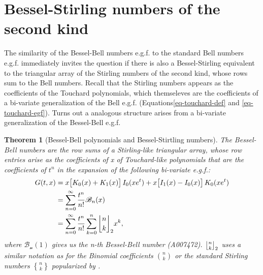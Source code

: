 \documentclass[a4paper]{amsart}
\newcommand{\Stirling}[0]{\genfrac\{\}{0pt}{}}
\newcommand{\mStirling}[0]{\genfrac{\lfloor}{\rfloor}{0pt}{}}
\newtheorem{theorem}{Theorem}
\begin{document}
\section{Bessel-Stirling numbers of the second kind}\label{sec-2-stirling}

The similarity of the Bessel-Bell numbers e.g.f. to the standard Bell numbers e.g.f. immediately invites the question if there is also a Bessel-Stirling equivalent to the triangular array of the Stirling numbers of the second kind, whose rows sum to the Bell numbers. Recall that the Stirling numbers appears as the coefficients of the Touchard polynomials, which themseleves are the coefficients of a bi-variate generalization of the Bell e.g.f. (Equations\eqref{eq-touchard-def} and \eqref{eq-touchard-egf}). Turns out a analogous structure arises from a bi-variate generalization of the Bessel-Bell e.g.f.

\begin{theorem}[Bessel-Bell polynomials and Bessel-Stirtling numbers]\label{thm-bb-polynomials}
The Bessel-Bell numbers are the row sums of a Stirling-like triangular array, whose row entries arise as the coefficients of x of Touchard-like polynomials that are the coefficients of $t^n$ in the expansion of the following bi-variate e.g.f.:
    \begin{equation*}
        \begin{aligned}
        G(t,x) &= x\big[K_0(x)+K_1(x)\big]\, I_0(x e^t) + x\big[I_1(x)-I_0(x)\big]\,K_0(xe^t)\\
                       &= \sum_{n=0}^\infty \frac{t^n}{n!}\mathscr{B}_n(x) \\
                       & = \sum_{n=0}^\infty\frac{t^n}{n!}\sum_{k=0}^{n}\mStirling{n}{k}_2 x^k, \\
        \end{aligned}
    \end{equation*}
    where $\mathscr{B_n}(1)$ gives us the n-th Bessel-Bell number (A007472). $\mStirling{n}{k}_2$ uses a similar notation as for the Binomial coefficients $\binom{n}{k}$ or the standard Stirling numbers $\Stirling{n}{k}$ popularized by \cite{graham_concrete_nodate}.
\end{theorem}
\end{document}
